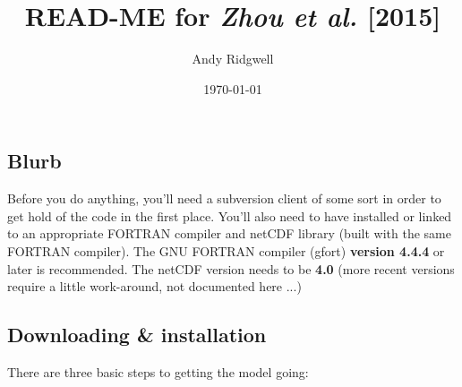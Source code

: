 \documentclass[10pt,twoside]{article}
\title{READ-ME for \textit{Zhou et al.} [2015]}
\author{Andy Ridgwell}
\date{\today}
\begin{document}

\maketitle


\subsection{Blurb}

Before you do anything, you'll need a subversion client of some sort in order to get hold of the code in the first place. You'll also need to have installed or linked to an appropriate FORTRAN compiler and netCDF library (built with the same FORTRAN compiler). The GNU FORTRAN compiler (gfort) \textbf{version 4.4.4} or later is recommended. The netCDF version needs to be \textbf{4.0} (more recent versions require a little work-around, not documented here ...)


\subsection{Downloading \& installation}

There are three basic steps to getting the model going:
\end{document}
